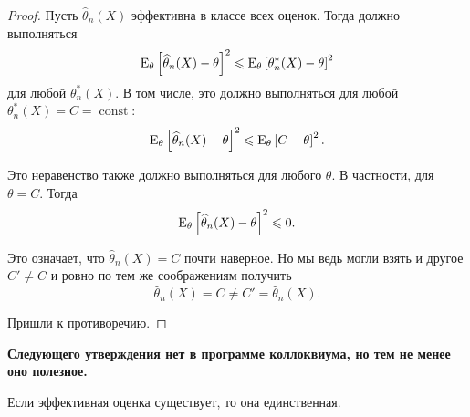 \begin{proof}
    Пусть $\widehat{\theta}_n(X)$ эффективна в классе всех оценок. Тогда должно выполняться
    \begin{equation*}
        \operatorname{E}_{\theta} \left[ \widehat{\theta}_n(X) - \theta \right]^2 \leqslant \operatorname{E}_{\theta} \left[ \theta^*_n(X) - \theta \right]^2
    \end{equation*}
    для любой $\theta_n^*(X)$. В том числе, это должно выполняться для любой $\theta_n^*(X) = C = \operatorname{const}$:
    \begin{equation*}
        \operatorname{E}_{\theta} \left[ \widehat{\theta}_n(X) - \theta \right]^2 \leqslant \operatorname{E}_{\theta} \left[ C - \theta \right]^2.
    \end{equation*}

    Это неравенство также должно выполняться для любого $\theta$. В частности, для $\theta = C$. Тогда
    \begin{equation*}
        \operatorname{E}_{\theta} \left[ \widehat{\theta}_n(X) - \theta \right]^2 \leqslant 0.
    \end{equation*}

    Это означает, что $\widehat{\theta}_n(X) = C$ почти наверное. Но мы ведь могли взять и другое $C' \neq C$ и ровно по тем же соображениям получить
    \begin{equation*}
        \widehat{\theta}_n(X) = C \neq C' = \widehat{\theta}_n(X).
    \end{equation*}

    Пришли к противоречию.
\end{proof}

\textbf{Следующего утверждения нет в программе коллоквиума, но тем не менее оно полезное.}

\begin{proposition*}
    Если эффективная оценка существует, то она единственная.
\end{proposition*}

